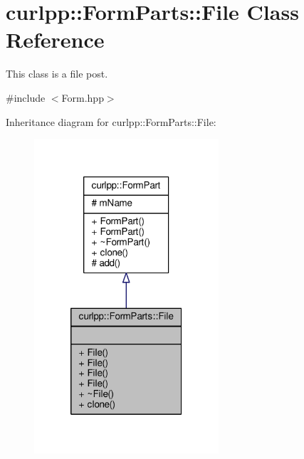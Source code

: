 \hypertarget{classcurlpp_1_1FormParts_1_1File}{\section{curlpp\-:\-:Form\-Parts\-:\-:File Class Reference}
\label{classcurlpp_1_1FormParts_1_1File}
}


This class is a file post.  




{\ttfamily \#include $<$Form.\-hpp$>$}



Inheritance diagram for curlpp\-:\-:Form\-Parts\-:\-:File\-:\nopagebreak
\begin{figure}[H]
\begin{center}
\leavevmode
\includegraphics[width=194pt]{classcurlpp_1_1FormParts_1_1File__inherit__graph}
\end{center}
\end{figure}


